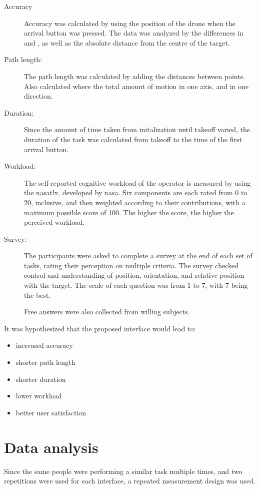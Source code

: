   \begin{description}
    \item[Accuracy]
      Accuracy was calculated by using the position of the drone when the arrival button was pressed.
      The data was analyzed by the differences in  and , as well as the absolute distance from the centre of the target.
    \item[Path length:]
      The path length was calculated by adding the distances between points. Also calculated where the total amount of motion in one axis, and in one direction.
    \item[Duration:]
      Since the amount of time taken from initalization until takeoff varied, the duration of the task was calculated from takeoff to the time of the first arrival button.
    \item[Workload:]
      The self-reported cognitive workload of the operator is measured by using the \gls{nasatlx}, developed by \gls{nasa}.
      Six components are each rated from 0 to 20, inclusive, and then weighted according to their contributions, with a maximum possible score of 100.
      The higher the score, the higher the perceived workload.
    \item[Survey:]
      The participants were asked to complete a survey at the end of each set of tasks, rating their perception on multiple criteria.
      The survey checked control and understanding of position, orientation, and relative position with the target.
      The scale of each question was from 1 to 7, with 7 being the best.

      Free answers were also collected from willing subjects.
  \end{description}

  It was hypothesized that the proposed interface would lead to:

  \begin{itemize}
    \item increased accuracy
    \item shorter path length
    \item shorter duration
    \item lower workload
    \item better user satisfaction
  \end{itemize}
  
\section{Data analysis}
  Since the same people were performing a similar task multiple times, and two repetitions were used for each interface, a repeated measurement design was used.
  
